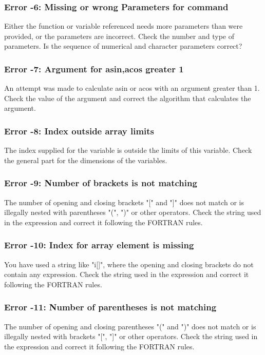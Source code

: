 \subsubsection{Error -6: Missing or wrong Parameters for command}
\par
Either the function or variable referenced needs more parameters than 
were provided, or the parameters are incorrect. Check the number and 
type of parameters. Is the sequence of numerical and character parameters 
correct? 
\subsubsection{Error -7: Argument for asin,acos greater 1}
\par
An attempt was made to calculate asin or acos with an argument greater 
than 1. Check the value of the argument and correct the algorithm 
that calculates the argument. 
\subsubsection{Error -8: Index outside array limits}
\par
The index supplied for the variable is outside the limits of this 
variable. Check the general part for the dimensions of the variables. 
\subsubsection{Error -9: Number of brackets is not matching}
\par
The number of opening and closing brackets "[" and "]" does not match 
or is illegally nested with parentheses "(", ")" or other operators. 
Check the string used in the expression and correct it following the 
FORTRAN rules. 
\subsubsection{Error -10: Index for array element is missing}
\par
You have used a string like "i[]", where the opening and closing 
brackets do not contain any expression. 
Check the string used in the expression and correct it following the 
FORTRAN rules. 
\subsubsection{Error -11: Number of parentheses is not matching}
\par
The number of opening and closing parentheses "(" and ")" does not match 
or is illegally nested with brackets "[", "]" or other operators. 
Check the string used in the expression and correct it following the 
FORTRAN rules. 
